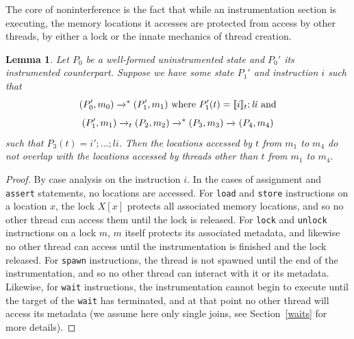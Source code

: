 \documentclass[preprint, 9pt]{sigplanconf}
\newcommand{\meanl}{\ensuremath{[ \! [}}
\newcommand{\meanr}{\ensuremath{] \! ]}}
\newcommand{\means}[1]{\ensuremath{\meanl #1 \meanr}}
\newcommand{\instr}[2]{\ensuremath{\means{#2}_{#1}}}
\newcommand{\cfg}[2]{\ensuremath{(#1, #2)}}
\newcommand{\anarrow}[2]{\ensuremath{\xrightarrow{#2}_{#1}}}
\newcommand{\exec}[5]{\ensuremath{\cfg{#1}{#2} \anarrow{#3}{#4} #5}}
\newcommand{\execstar}[4]{\ensuremath{\cfg{#1}{#2} \tto{#3} #4}}
\newcommand{\execs}[3]{\ensuremath{ \xrightarrow{#2}_{#1} #3}}
\newcommand{\execstars}[2]{\ensuremath{ \tto{#1} #2}}
\newcommand{\tto}[1]{\mathrel{
  \vphantom{\xrightarrow{#1}}
  \smash{\xrightarrow{#1}}
  \vphantom{\to}^{*}}
}
\newtheorem{lemma}{Lemma}
\begin{document}
The core of noninterference is the fact that while an instrumentation section is executing, the memory locations it accesses are protected from access by other threads, by either a lock or the innate mechanics of thread creation.
\begin{lemma}\label{indep}Let $P_0$ be a well-formed uninstrumented state and $P_0'$ its instrumented counterpart. Suppose we have some state $P_1'$ and instruction $i$ such that \[\execstar{P_0'}{m_0}{}{(P_1', m_1)}\ \mathrm{where}\ P_1'(t) = \instr{t}{i}; \mathit{li} \ \mathrm{and}\] \[\exec{P_1'}{m_1}{t}{}{(P_2, m_2)} \execstars{}{(P_3, m_3)} \execs{}{}{(P_4, m_4)}\] such that $P_3(t) = i'; ...; \mathit{li}$. Then the locations accessed by $t$ from $m_1$ to $m_4$ do not overlap with the locations accessed by threads other than $t$ from $m_1$ to $m_4$.\end{lemma}
\begin{proof}By case analysis on the instruction $i$. In the cases of assignment and \texttt{assert} statements, no locations are accessed. For \texttt{load} and \texttt{store} instructions on a location $x$, the lock $X[x]$ protects all associated memory locations, and so no other thread can access them until the lock is released. For \texttt{lock} and \texttt{unlock} instructions on a lock $m$, $m$ itself protects its associated metadata, and likewise no other thread can access until the instrumentation is finished and the lock released. For \texttt{spawn} instructions, the thread is not spawned until the end of the instrumentation, and so no other thread can interact with it or its metadata. Likewise, for \texttt{wait} instructions, the instrumentation cannot begin to execute until the target of the \texttt{wait} has terminated, and at that point no other thread will access its metadata (we assume here only single joins, see Section~\ref{waits} for more details).\end{proof}
\end{document}
